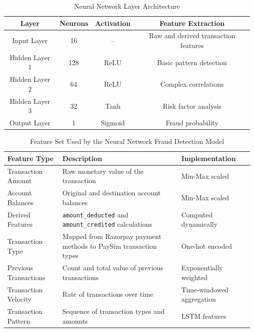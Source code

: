 \begin{table}[!htb]
\centering
\begin{tabular}{|c|c|c|c|}
\hline
\textbf{Layer} & \textbf{Neurons} & \textbf{Activation} & \textbf{Feature Extraction} \\
\hline
Input Layer & 16 & -- & Raw and derived transaction features \\
\hline
Hidden Layer 1 & 128 & ReLU & Basic pattern detection \\
\hline
Hidden Layer 2 & 64 & ReLU & Complex correlations \\
\hline
Hidden Layer 3 & 32 & Tanh & Risk factor analysis \\
\hline
Output Layer & 1 & Sigmoid & Fraud probability \\
\hline
\end{tabular}
\caption{Neural Network Layer Architecture}
\label{tab:nn_layers}
\end{table}

\begin{table}[!htb]
\centering
\small
\begin{tabular}{|p{2.8cm}|p{7cm}|p{2.8cm}|}
\hline
\cellcolor{lightblue!30}\textbf{Feature Type} & \cellcolor{lightblue!30}\textbf{Description} & \cellcolor{lightblue!30}\textbf{Implementation} \\
\hline
Transaction Amount & Raw monetary value of the transaction & Min-Max scaled \\
\hline
Account Balances & Original and destination account balances & Min-Max scaled \\
\hline
Derived Features & \texttt{amount\_deducted} and \texttt{amount\_credited} calculations & Computed dynamically \\
\hline
Transaction Type & Mapped from Razorpay payment methods to PaySim transaction types & One-hot encoded \\
\hline
Previous Transactions & Count and total value of previous transactions & Exponentially weighted \\
\hline
Transaction Velocity & Rate of transactions over time & Time-windowed aggregation \\
\hline
Transaction Pattern & Sequence of transaction types and amounts & LSTM features \\
\hline
\end{tabular}
\caption{Feature Set Used by the Neural Network Fraud Detection Model}
\label{table:features}
\end{table}

